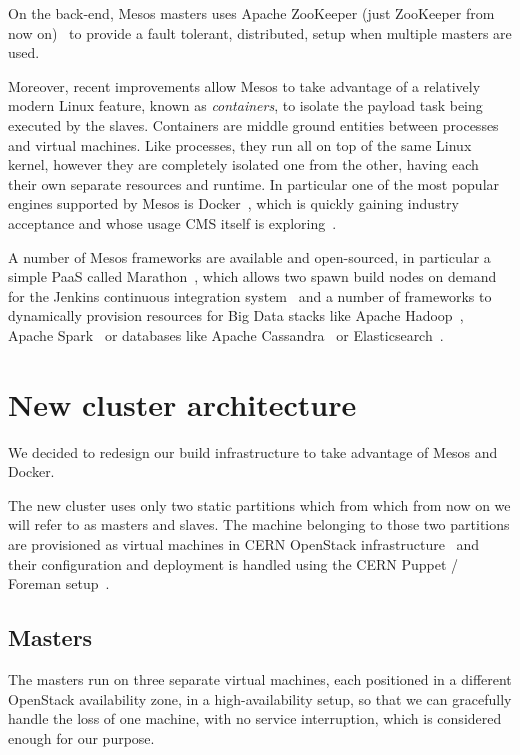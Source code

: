 \documentclass[a4paper]{jpconf}
\begin{document}
On the back-end, Mesos masters uses Apache ZooKeeper (just ZooKeeper from
now on)~\cite{ZOOKEEPER} to provide a fault tolerant, distributed,
setup when multiple masters are used.

Moreover, recent improvements allow Mesos to take advantage of a relatively
modern Linux feature, known as \textit{containers}, to isolate the payload task
being executed by the slaves. Containers are middle ground entities between
processes and virtual machines. Like processes, they run all on top of the same
Linux kernel, however they are completely isolated one from the other, having
each their own separate resources and runtime. In particular one of the most
popular engines supported by Mesos is Docker~\cite{DOCKER}, which is quickly
gaining industry acceptance and whose usage CMS itself is
exploring~\cite{DOCKERPAPER}.

A number of Mesos frameworks are available and open-sourced, in
particular a simple PaaS called Marathon~\cite{MARATHON}, which
allows two spawn build nodes on demand for the Jenkins continuous
integration system~\cite{MESOSJENKINS} and a number of frameworks
to dynamically provision resources for Big Data stacks like
Apache Hadoop~\cite{MESOSHADOOP}, Apache Spark~\cite{MESOSSPARK}
or databases like Apache Cassandra~\cite{MESOSCASSANDRA} or
Elasticsearch~\cite{MESOSELASTIC}.

\section{New cluster architecture}

We decided to redesign our build infrastructure to take advantage of Mesos and
Docker.

The new cluster uses only two static partitions which from which from now on we
will refer to as masters and slaves. The machine belonging to those two
partitions are provisioned as virtual machines in CERN OpenStack
infrastructure~\cite{CERNOPENSTACK} and their configuration and deployment is
handled using the CERN Puppet / Foreman setup~\cite{CERNCFG}.

\subsection{Masters}

The masters run on three separate virtual machines, each positioned in a
different OpenStack availability zone, in a high-availability setup, so that we
can gracefully handle the loss of one machine, with no service interruption,
which is considered enough for our purpose.
\end{document}

